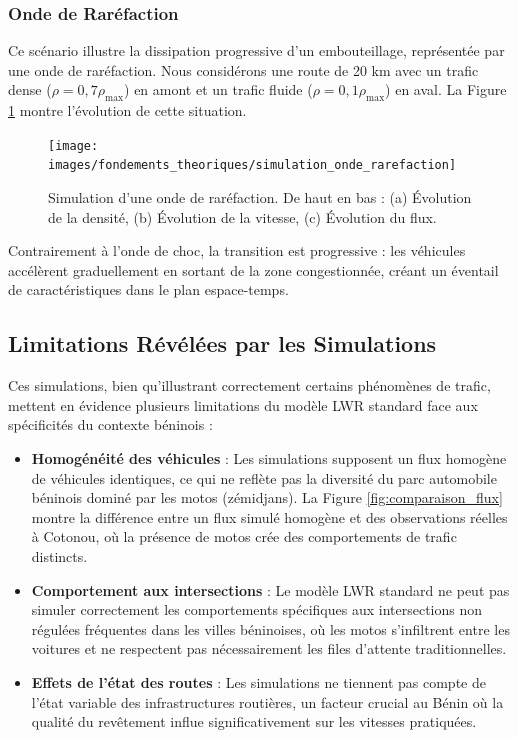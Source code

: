 \subsubsection{Onde de Raréfaction}
\label{subsubsec:rarefaction_sim}

Ce scénario illustre la dissipation progressive d'un embouteillage, représentée par une onde de raréfaction. Nous considérons une route de 20 km avec un trafic dense ($\rho = 0,7\rho_{\max}$) en amont et un trafic fluide ($\rho = 0,1\rho_{\max}$) en aval. La Figure \ref{fig:sim_rarefaction} montre l'évolution de cette situation.

\begin{figure}[htbp]
\centering
\texttt{[image: images/fondements\_theoriques/simulation\_onde\_rarefaction]}
\caption{Simulation d'une onde de raréfaction. De haut en bas : (a) Évolution de la densité, (b) Évolution de la vitesse, (c) Évolution du flux.}
\label{fig:sim_rarefaction}
\end{figure}

Contrairement à l'onde de choc, la transition est progressive : les véhicules accélèrent graduellement en sortant de la zone congestionnée, créant un éventail de caractéristiques dans le plan espace-temps.

\subsection{Limitations Révélées par les Simulations}
\label{subsec:limitations_sim}

Ces simulations, bien qu'illustrant correctement certains phénomènes de trafic, mettent en évidence plusieurs limitations du modèle LWR standard face aux spécificités du contexte béninois :

\begin{itemize}
    \item \textbf{Homogénéité des véhicules} : Les simulations supposent un flux homogène de véhicules identiques, ce qui ne reflète pas la diversité du parc automobile béninois dominé par les motos (zémidjans). La Figure \ref{fig:comparaison_flux} montre la différence entre un flux simulé homogène et des observations réelles à Cotonou, où la présence de motos crée des comportements de trafic distincts.
    
    \item \textbf{Comportement aux intersections} : Le modèle LWR standard ne peut pas simuler correctement les comportements spécifiques aux intersections non régulées fréquentes dans les villes béninoises, où les motos s'infiltrent entre les voitures et ne respectent pas nécessairement les files d'attente traditionnelles.
    
    \item \textbf{Effets de l'état des routes} : Les simulations ne tiennent pas compte de l'état variable des infrastructures routières, un facteur crucial au Bénin où la qualité du revêtement influe significativement sur les vitesses pratiquées.
\end{itemize}

